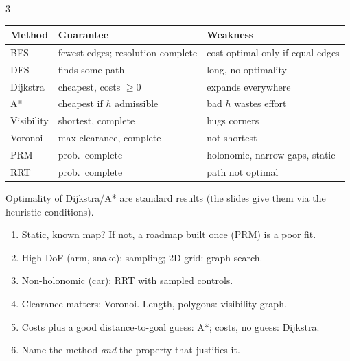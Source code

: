 \begin{multicols}{3}
\begin{tabularx}{\linewidth}{@{}lXX@{}}\toprule
Method & Guarantee & Weakness\\\midrule
BFS & fewest edges; resolution complete & cost-optimal only if equal edges\\
DFS & finds some path & long, no optimality\\
Dijkstra & cheapest, costs $\ge0$ & expands everywhere\\
A* & cheapest if $h$ admissible & bad $h$ wastes effort\\
Visibility & shortest, complete & hugs corners\\
Voronoi & max clearance, complete & not shortest\\
PRM & prob.\ complete & holonomic, narrow gaps, static\\
RRT & prob.\ complete & path not optimal\\\bottomrule
\end{tabularx}
Optimality of Dijkstra/A* are standard results (the slides give them via the heuristic conditions).
\begin{recipe}
\begin{enumerate}
\item Static, known map? If not, a roadmap built once (PRM) is a poor fit.
\item High DoF (arm, snake): sampling; 2D grid: graph search.
\item Non-holonomic (car): RRT with sampled controls.
\item Clearance matters: Voronoi. Length, polygons: visibility graph.
\item Costs plus a good distance-to-goal guess: A*; costs, no guess: Dijkstra.
\item Name the method \emph{and} the property that justifies it.
\end{enumerate}
\end{recipe}
\end{multicols}
